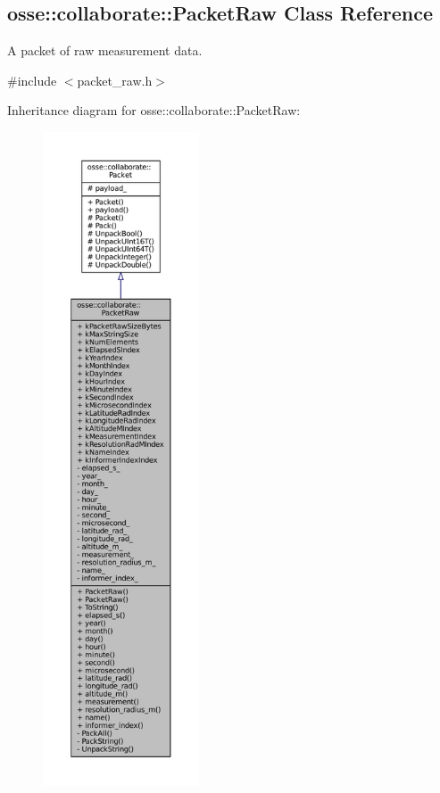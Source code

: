 \hypertarget{classosse_1_1collaborate_1_1_packet_raw}{}\subsection{osse\+:\+:collaborate\+:\+:Packet\+Raw Class Reference}
\label{classosse_1_1collaborate_1_1_packet_raw}


A packet of raw measurement data.  




{\ttfamily \#include $<$packet\+\_\+raw.\+h$>$}



Inheritance diagram for osse\+:\+:collaborate\+:\+:Packet\+Raw\+:
\nopagebreak
\begin{figure}[H]
\begin{center}
\leavevmode
\includegraphics[height=550pt]{classosse_1_1collaborate_1_1_packet_raw__inherit__graph}
\end{center}
\end{figure}

